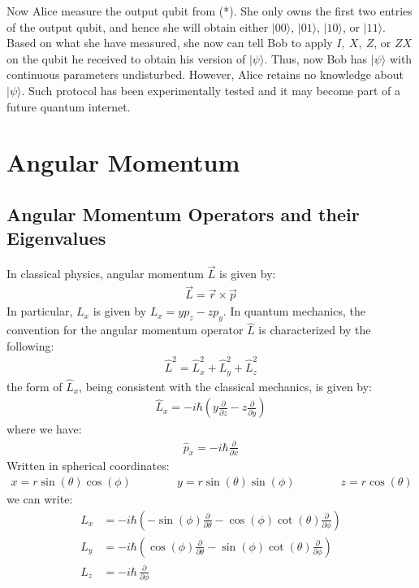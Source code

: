 \documentclass[11pt]{book}
\theoremstyle{break}
\theoremstyle{break}
\newcommand{\pd}{\partial}
\begin{document}
Now Alice measure the output qubit from (*). She only owns the first two entries of the output qubit, and hence she will obtain either $|00\rangle$, $|01\rangle$, $|10\rangle$, or $|11\rangle$. Based on what she have measured, she now can tell Bob to apply $I,\ X,\ Z$, or $ZX$ on the qubit he received to obtain his version of $|\psi\rangle$. Thus, now Bob has $|\psi\rangle$ with continuous parameters undisturbed. However, Alice retains no knowledge about $|\psi\rangle$. Such protocol has been experimentally tested and it may become part of a future quantum internet.



\newpage
\chapter{Angular Momentum}
\section[Angular Momentum Operators and their Eigenvalues]{\color{red}Angular Momentum Operators and their Eigenvalues\color{black}}
In classical physics, angular momentum $\vec{L}$ is given by:
\begin{align*}
\vec{L} = \vec{r} \times \vec{p}
\end{align*}
In particular, $L_x$ is given by $L_x = yp_z - zp_y$. In quantum mechanics, the convention for the angular momentum operator $\hat{L}$ is characterized by the following:
\begin{align}
\hat{L}^2 = \hat{L}_x^2 + \hat{L}_y^2 + \hat{L}_z^2
\end{align}
the form of $\hat{L}_x$, being consistent with the classical mechanics, is given by:
\begin{align*}
\hat{L}_x  = -i\hbar\left( y \frac{\pd}{\pd z} - z \frac{\pd }{\pd y}\right) 
\end{align*}
where we have:
\begin{align*}
\hat{p}_x = -i\hbar \frac{\pd}{\pd x}
\end{align*}
Written in spherical coordinates:
\begin{align*}
x = r\sin(\theta)\cos(\phi) \qquad\qquad y = r\sin(\theta) \sin(\phi) \qquad\qquad z = r\cos(\theta)
\end{align*}
we can write:
\begin{align*}
\hat{L}_x &= -i\hbar\left( -\sin(\phi) \frac{\pd}{\pd \theta} - \cos(\phi) \cot(\theta)\frac{\pd}{\pd \phi}\right) \\
\hat{L}_y &= -i\hbar\left( \cos(\phi) \frac{\pd}{\pd \theta} - \sin(\phi) \cot(\theta) \frac{\pd}{\pd \phi}\right) \\
\hat{L}_z &= -i\hbar \, \frac{\pd}{\pd \phi}
\end{align*}
\end{document}
